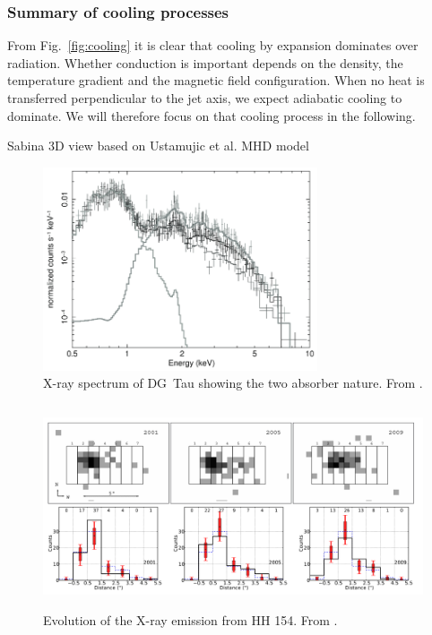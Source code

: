 \subsubsection{Summary of cooling processes}
From Fig.~\ref{fig:cooling} it is clear that cooling by expansion dominates over radiation. Whether conduction is important depends on the density, the temperature gradient and the magnetic field configuration. When no heat is transferred perpendicular to the jet axis, we expect adiabatic cooling to dominate. We will therefore focus on that cooling process in the following.



{\color{blue}Sabina
3D view based on Ustamujic et al. MHD model}



\begin{figure}[t]
\centering

\includegraphics[height=6cm]{figs/tax}
\caption{X-ray spectrum of DG~Tau showing the two absorber nature. From \citet{}. \label{fig:tax}}
\end{figure}



\begin{figure}[t]
\centering

\includegraphics[height=6cm]{figs/hh154}
\caption{Evolution of the X-ray emission from HH 154. From \citet{Schneider_2011}. \label{fig:hh154}}
\end{figure}


